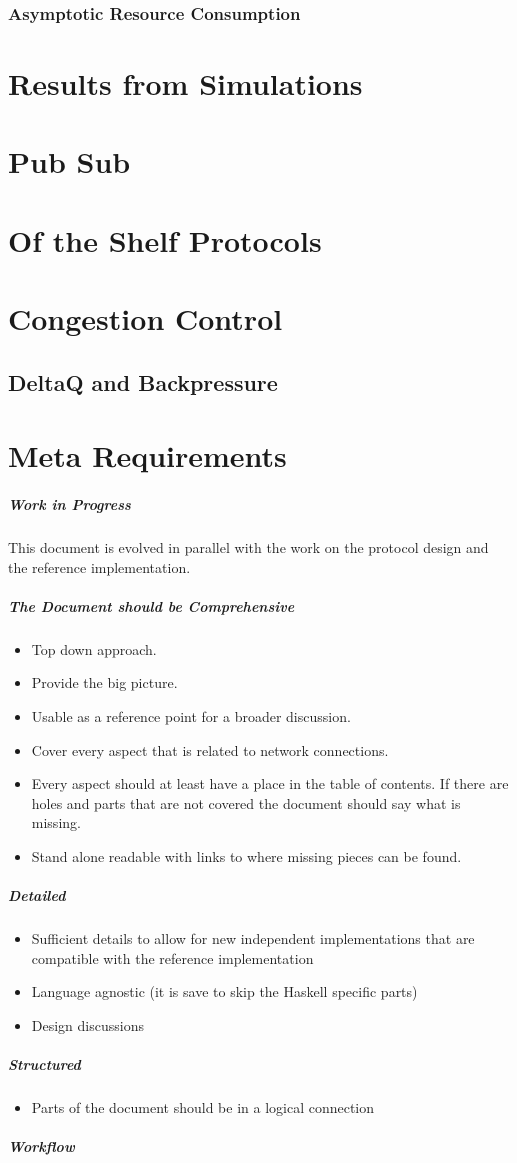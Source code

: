 \documentclass{report}
\newcommand{\wip}[1]{\color{magenta}{#1}\color{black}}
\theoremstyle{definition}{
  \newtheorem{lemma}{Lemma}[section] %
  \newtheorem{definition}[lemma]{Definition}
}
\theoremstyle{theorem}{
  \newtheorem{invariant}[lemma]{Invariant}
  \newtheorem{proofobligation}[lemma]{Proof Obligation}
}
\numberwithin{equation}{lemma}
\begin{document}
\subsubsection{Asymptotic Resource Consumption}
\section{Results from Simulations}
\section{Pub Sub}
\section{Of the Shelf Protocols}
\section{Congestion Control}
\subsection{DeltaQ and Backpressure}
\label{deltaq-discussion}
\wip{WIP: discuss DeltaQ and Backpressure}

\section{Meta Requirements}
\subparagraph{Work in Progress}
This document is evolved in parallel with the work on the protocol design and
the reference implementation.

\subparagraph{The Document should be Comprehensive}
\begin{itemize}
\item Top down approach.
\item Provide the big picture.
\item Usable as a reference point for a broader discussion.
\item Cover every aspect that is related to network connections.
\item Every aspect should at least have a place in the table of contents.
  If there are holes and parts that are not covered the document should say what is missing.
\item Stand alone readable with links to where missing pieces can be found.
\end{itemize}

\subparagraph{Detailed}
\begin{itemize}
\item Sufficient details to allow for new independent implementations that are compatible with
the reference implementation
\item Language agnostic (it is save to skip the Haskell specific parts)
\item Design discussions
\end{itemize}
\subparagraph{Structured}
\begin{itemize}
\item Parts of the document should be in a logical connection
\end{itemize}
\subparagraph{Workflow}
\end{document}
